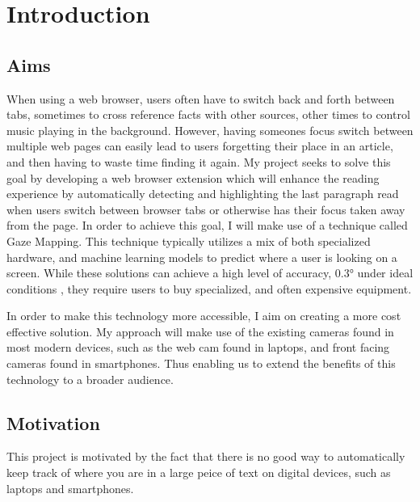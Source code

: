 \documentclass[twocolumn]{report}
\begin{document}
\tableofcontents

\chapter{Introduction}


\section{Aims}


When using a web browser, users often have to switch back and forth between tabs, sometimes to cross reference facts with other sources, other times to control music playing in the background. However, having someones focus switch between multiple web pages can easily lead to users forgetting their place in an article, and then having to waste time finding it again. My project seeks to solve this goal by developing a web browser extension which will enhance the reading experience by automatically detecting and highlighting the last paragraph read when users switch between browser tabs or otherwise has their focus taken away from the page. In order to achieve this goal, I will make use of a technique called Gaze Mapping. This technique typically utilizes a mix of both specialized hardware, and machine learning models to predict where a user is looking on a screen. While these solutions can achieve a high level of accuracy, $\ang{0.3}$ under ideal conditions \cite{tobiiprofusion}, they require users to buy specialized, and often expensive equipment. 

In order to make this technology more accessible, I aim on creating a more cost effective solution. My approach will make use of the existing cameras found in most modern devices, such as the web cam found in laptops, and front facing cameras found in smartphones. Thus enabling us to extend the benefits of this technology to a broader audience. 

\section{Motivation}

This project is motivated by the fact that there is no good way to automatically keep track of where you are in a large peice of text on digital devices, such as laptops and smartphones. 
\end{document}
